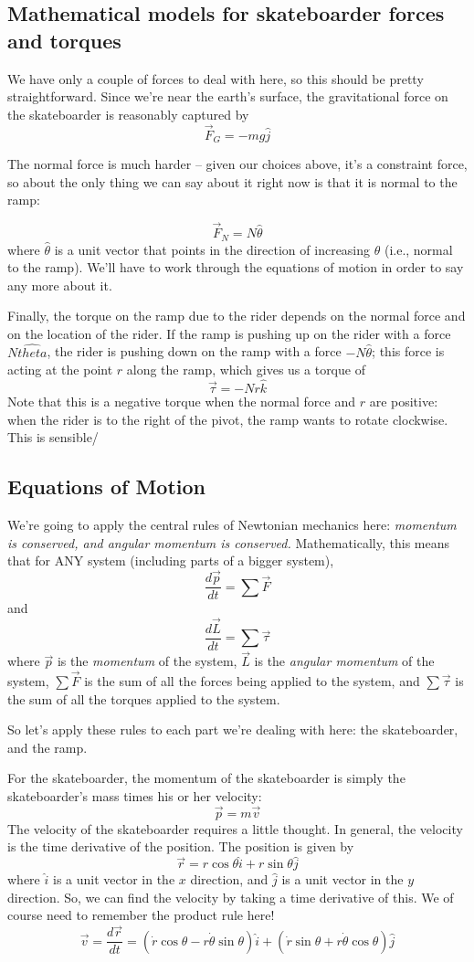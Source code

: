 \documentclass{tufte-handout}
\begin{document}
\subsection{Mathematical models for skateboarder forces and torques}

We have only a couple of forces to deal with here, so this should be pretty straightforward.
Since we're near the earth's surface, the gravitational force on the skateboarder is  reasonably captured by 
$$\vec{F}_{G} = -m g \hat{j}$$

The normal force is much harder -- given our choices above, it's a constraint force, so about the only thing we can say about it right now is that it is normal to the ramp:

$$\vec{F}_N = N \hat{\theta}$$
where $\hat{\theta}$ is a unit vector that points in the direction of increasing $\theta$ (i.e., normal to the ramp).  We'll have to work through the equations of motion in order to say any more about it.

Finally, the torque on the ramp due to the rider depends on the normal force and on the location of the rider.  If the ramp is pushing up on the rider with a force $N\hat{theta}$, the rider is pushing down on the ramp with a force $-N \hat{\theta}$; this force is acting at the point $r$ along the ramp, which gives us a torque of 
$$\vec{\tau} = -N r \hat{k}$$
Note that this is a negative torque when the normal force and $r$ are positive: when the rider is to the right of the pivot, the ramp wants to rotate clockwise.  This is sensible/

\subsection{Equations of Motion}

We're going to apply the central rules of Newtonian mechanics here:  {\em momentum is conserved, and angular momentum is conserved.}  Mathematically, this means that for ANY system (including parts of a bigger system),
$$\frac{d\vec{p}}{dt} = \sum \vec{F}$$
and
$$\frac{d\vec{L}}{dt} = \sum \vec{\tau}$$
where $\vec{p}$ is the {\it momentum} of the system, $\vec{L}$ is the {\it angular momentum} of the system, $\sum \vec{F}$ is the sum of all the forces being applied to the system, and $\sum \vec{\tau}$ is the sum of all the torques applied to the system.

So let's apply these rules to each part we're dealing with here: the skateboarder, and the ramp.

For the skateboarder, the momentum of the skateboarder is simply the skateboarder's mass times his or her velocity:
$$\vec{p} = m\vec{v}$$
The velocity of the skateboarder requires a little thought.  In general, the velocity is the time derivative of the position. The position is given by 
$$\vec{r} = r \cos \theta \hat{i} + r \sin \theta \hat{j}$$
where $\hat{i}$ is a unit vector in the $x$ direction, and $\hat{j}$ is a unit vector in the $y$ direction.  So, we can find the velocity by taking a time derivative of this.  We of course need to remember the product rule here!
$$\vec{v} = \frac{d\vec{r}}{dt} = (\dot{r} \cos \theta  - r \dot{\theta} \sin{\theta}) \hat{i}+ (\dot{r} \sin \theta + r \dot{\theta} \cos{\theta}) \hat{j}$$
\end{document}
